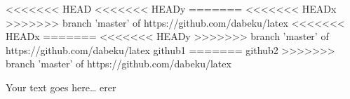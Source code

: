 <<<<<<< HEAD
<<<<<<< HEADy
=======
<<<<<<< HEADx
>>>>>>> branch 'master' of https://github.com/dabeku/latex
<<<<<<< HEADx
=======
<<<<<<< HEADy
>>>>>>> branch 'master' of https://github.com/dabeku/latex
github1
=======
github2
>>>>>>> branch 'master' of https://github.com/dabeku/latex

Your text goes here…
erer
